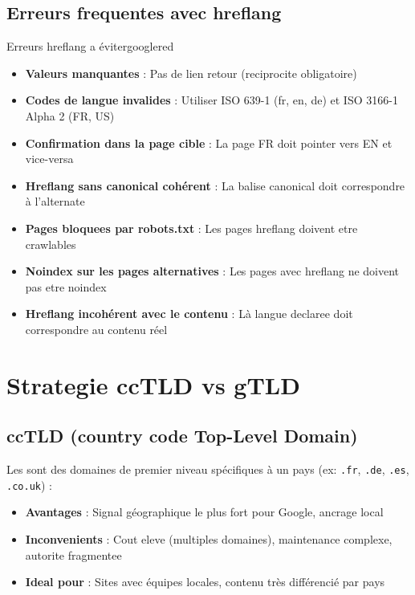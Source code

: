 \subsection{Erreurs frequentes avec hreflang}

\begin{mybox}{Erreurs hreflang a éviter}{googlered}
\begin{itemize}
    \item \textbf{Valeurs manquantes} : Pas de lien retour (reciprocite obligatoire)
    \item \textbf{Codes de langue invalides} : Utiliser ISO 639-1 (fr, en, de) et ISO 3166-1 Alpha 2 (FR, US)
    \item \textbf{Confirmation dans la page cible} : La page FR doit pointer vers EN et vice-versa
    \item \textbf{Hreflang sans canonical cohérent} : La balise canonical doit correspondre à l'alternate
    \item \textbf{Pages bloquees par robots.txt} : Les pages hreflang doivent etre crawlables
    \item \textbf{Noindex sur les pages alternatives} : Les pages avec hreflang ne doivent pas etre noindex
    \item \textbf{Hreflang incohérent avec le contenu} : Là langue declaree doit correspondre au contenu réel
\end{itemize}
\end{mybox}

\section{Strategie ccTLD vs gTLD}

\subsection{ccTLD (country code Top-Level Domain)}

Les  sont des domaines de premier niveau spécifiques à un pays (ex: \texttt{.fr}, \texttt{.de}, \texttt{.es}, \texttt{.co.uk}) :

\begin{itemize}
    \item \textbf{Avantages} : Signal géographique le plus fort pour Google, ancrage local
    \item \textbf{Inconvenients} : Cout eleve (multiples domaines), maintenance complexe, autorite fragmentee
    \item \textbf{Ideal pour} : Sites avec équipes locales, contenu très différencié par pays
\end{itemize}

